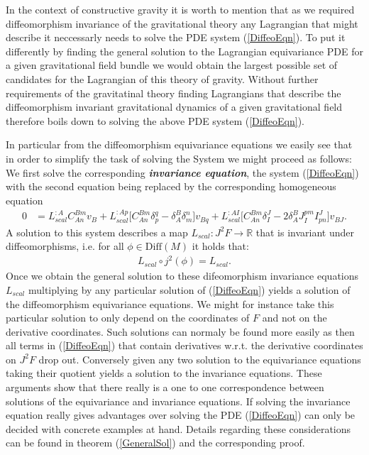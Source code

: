 \documentclass[a4paper,12pt, DIV=14, BCOR=5mm, twoside, headsepline]{scrbook}
\begin{document}
In the context of constructive gravity it is worth to mention that as we required diffeomorphism invariance of the gravitational theory any Lagrangian that might describe it neccessarly needs to solve the PDE system (\ref{DiffeoEqn}). To put it differently by finding the general solution to the Lagrangian equivariance PDE for a given gravitational field bundle we would obtain the largest possible set of candidates for the Lagrangian of this theory of gravity. Without further requirements of the gravitatinal theory finding Lagrangians that describe the diffeomorphism invariant gravitational dynamics of a given gravitational field therefore boils down to solving the above PDE system (\ref{DiffeoEqn}). 

In particular from the diffeomorphism equivariance equations we easily see that in order to simplify the task of solving the System we might proceed as follows:
We first solve the corresponding \textit{\textbf{invariance equation}}, the system (\ref{DiffeoEqn}) with the second equation being replaced by the corresponding homogeneous equation
\begin{align}
    0 &= L_{scal}^{:A} C_{An}^{Bm} v_B + L_{scal}^{:Ap} \bigl[ C_{An}^{Bm} \delta_p^q - \delta_A^B \delta_m^n \bigr] v_{Bq} + L_{scal}^{:AI} \bigl[ C_{An}^{Bm} \delta_I^J - 2 \delta_A^B J_I^{pm} I^J_{pn}  \bigr] v_{BJ}.
\end{align}
A solution to this system describes a map $L_{scal}: J^2F \rightarrow \mathbb{R}$ that is invariant under diffeomorphisms, i.e. for all $\phi \in \mathrm{Diff}(M)$ it holds that:
\begin{align}
    L_{scal} \circ j^2(\phi) = L_{scal}.
\end{align}
Once we obtain the general solution to these difeomorphism invariance equations $L_{scal}$ multiplying by any particular solution of (\ref{DiffeoEqn}) yields a solution of the diffeomorphism equivariance equations. We might for instance take this particular solution to only depend on the coordinates of $F$ and not on the derivative coordinates. Such solutions can normaly be found more easily as then all terms in (\ref{DiffeoEqn}) that contain derivatives w.r.t. the derivative coordinates on $J^2F$ drop out. Conversely given any two solution to the equivariance equations taking their quotient yields a solution to the invariance equations. These arguments show that there really is a one to one correspondence between solutions of the equivariance and invariance equations. If solving the invariance equation really gives advantages over solving the PDE (\ref{DiffeoEqn}) can only be decided with concrete examples at hand. Details regarding these considerations can be found in theorem (\ref{GeneralSol}) and the corresponding proof. \\
\end{document}
